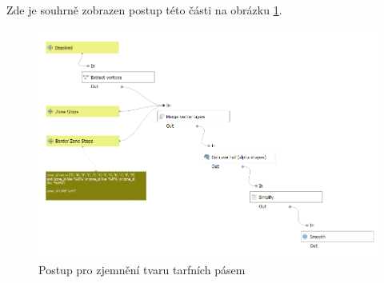 Zde je souhrně zobrazen postup této části na obrázku \ref{fig:postup-smooth}.

\begin{figure}[H] \centering
    \includegraphics[width=400pt]{./pictures/postup-smooth.png}
    \caption[Postup pro zjemnění tvaru tarfních pásem]{Postup pro zjemnění tvaru tarfních pásem}
	\label{fig:postup-smooth}              
\end{figure}